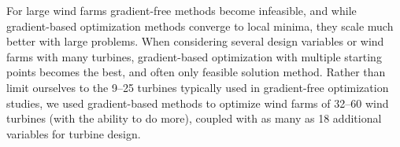 For large wind farms gradient-free methods become infeasible, and while gradient-based optimization methods converge to local minima, they scale much better with large problems. %
When considering several design variables or wind farms with many turbines,
gradient-based optimization with multiple starting points becomes the best, and often only feasible solution method. Rather than limit ourselves to the 9--25 turbines typically used in gradient-free optimization studies, we used gradient-based methods to optimize wind farms of 32--60 wind turbines (with the ability to do more), coupled with as many as 18 additional variables for turbine design.%

